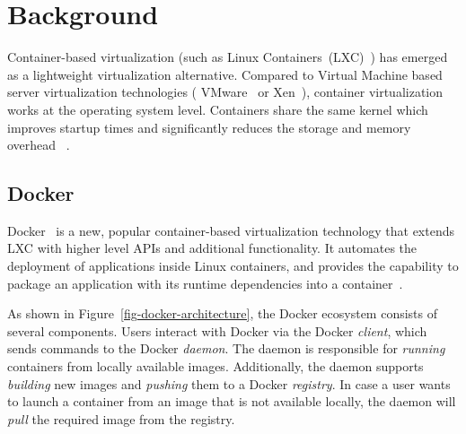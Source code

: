 \section{Background}
\label{sec:background}



Container-based virtualization (such as Linux Containers~(LXC)~\cite{LXC}) has emerged 
as a lightweight virtualization alternative.
Compared to Virtual Machine based server virtualization technologies (\eg
VMware~\cite{VMware} or Xen~\cite{xen}), container virtualization works at the
operating system level. Containers share the same kernel which improves startup
times and significantly reduces the storage and memory overhead ~\cite{ContainerVirtualization}.

\subsection{Docker}

Docker~\cite{docker} is a new, popular container-based virtualization technology that
extends LXC with higher level APIs and additional functionality. It automates the deployment
of applications inside Linux containers, and provides the capability to package an
application with its runtime dependencies into a container~\cite{slacker}.


As shown in Figure~\ref{fig-docker-architecture}, the Docker ecosystem consists of
several components.
%
Users interact with Docker via the Docker \emph{client}, which sends commands
to the Docker \emph{daemon}. The daemon is responsible for \emph{running} containers
from locally available images. Additionally, the daemon supports \emph{building} new
images and \emph{pushing} them to a Docker \emph{registry}. In case a user wants to
launch a container from an image that is not available locally, the daemon will
\emph{pull} the required image from the registry.

